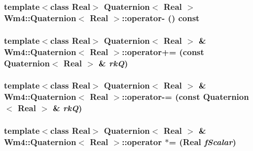 \subsubsection{\setlength{\rightskip}{0pt plus 5cm}template$<$class Real$>$ {\bf Quaternion}$<$ Real $>$ {\bf Wm4::Quaternion}$<$ Real $>$::operator- () const\hspace{0.3cm}{\tt  [inline]}}\label{classWm4_1_1Quaternion_9e92b601f1942231971eb3a84bd9649b}


\subsubsection{\setlength{\rightskip}{0pt plus 5cm}template$<$class Real$>$ {\bf Quaternion}$<$ Real $>$ \& {\bf Wm4::Quaternion}$<$ Real $>$::operator+= (const {\bf Quaternion}$<$ Real $>$ \& {\em rk\-Q})\hspace{0.3cm}{\tt  [inline]}}\label{classWm4_1_1Quaternion_b0ecdf716949ee56fd6b6f6fcf9ad2ca}


\subsubsection{\setlength{\rightskip}{0pt plus 5cm}template$<$class Real$>$ {\bf Quaternion}$<$ Real $>$ \& {\bf Wm4::Quaternion}$<$ Real $>$::operator-= (const {\bf Quaternion}$<$ Real $>$ \& {\em rk\-Q})\hspace{0.3cm}{\tt  [inline]}}\label{classWm4_1_1Quaternion_abc4c6eac448f8587a592b159485c872}


\subsubsection{\setlength{\rightskip}{0pt plus 5cm}template$<$class Real$>$ {\bf Quaternion}$<$ Real $>$ \& {\bf Wm4::Quaternion}$<$ Real $>$::operator $\ast$= (Real {\em f\-Scalar})\hspace{0.3cm}{\tt  [inline]}}\label{classWm4_1_1Quaternion_ac3d752a996ee6060b9bb624dd721195}



